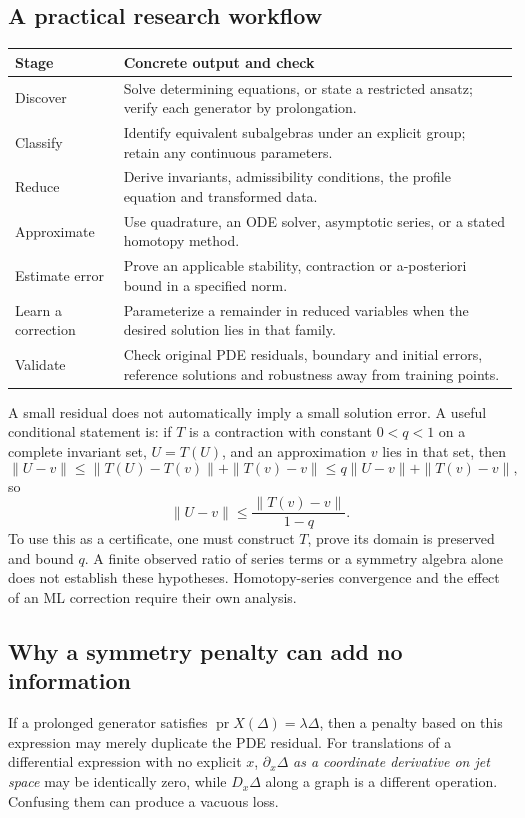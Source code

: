 \documentclass[11pt,a4paper]{article}
\numberwithin{equation}{section}
\theoremstyle{definition}
\theoremstyle{plain}
\theoremstyle{remark}
\newcommand{\pr}{\operatorname{pr}}
\begin{document}
\subsection{A practical research workflow}
\begin{tabularx}{\linewidth}{@{}p{.17\linewidth}Y@{}}
\toprule Stage & Concrete output and check \\
\midrule Discover & Solve determining equations, or state a restricted ansatz; verify each generator by prolongation.\\
Classify & Identify equivalent subalgebras under an explicit group; retain any continuous parameters.\\
Reduce & Derive invariants, admissibility conditions, the profile equation and transformed data.\\
Approximate & Use quadrature, an ODE solver, asymptotic series, or a stated homotopy method.\\
Estimate error & Prove an applicable stability, contraction or a-posteriori bound in a specified norm.\\
Learn a correction & Parameterize a remainder in reduced variables when the desired solution lies in that family.\\
Validate & Check original PDE residuals, boundary and initial errors, reference solutions and robustness away from training points.\\
\bottomrule
\end{tabularx}

A small residual does not automatically imply a small solution error. A useful conditional statement is: if $T$ is a contraction with constant $0<q<1$ on a complete invariant set, $U=T(U)$, and an approximation $v$ lies in that set, then
\[
\|U-v\|\le\|T(U)-T(v)\|+\|T(v)-v\|
\le q\|U-v\|+\|T(v)-v\|,
\]
so
\[
\boxed{\|U-v\|\le\frac{\|T(v)-v\|}{1-q}.}
\]
To use this as a certificate, one must construct $T$, prove its domain is preserved and bound $q$. A finite observed ratio of series terms or a symmetry algebra alone does not establish these hypotheses. Homotopy-series convergence and the effect of an ML correction require their own analysis.

\subsection{Why a symmetry penalty can add no information}
If a prolonged generator satisfies $\pr X(\Delta)=\lambda\Delta$, then a penalty based on this expression may merely duplicate the PDE residual. For translations of a differential expression with no explicit $x$, $\partial_x\Delta$ \emph{as a coordinate derivative on jet space} may be identically zero, while $D_x\Delta$ along a graph is a different operation. Confusing them can produce a vacuous loss.
\end{document}

